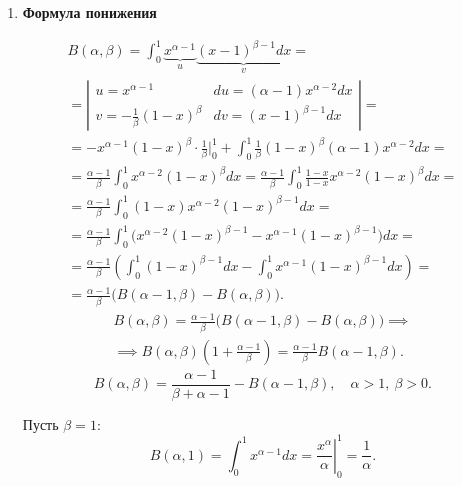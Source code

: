 \begin{enumerate}
    \item \textbf{Формула понижения}

          \begin{note}
              \begin{multline*}
                  B(\alpha,\beta) = \int_{0}^{1}\underbrace{x^{\alpha-1}}_{u}\underbrace{(x-1)^{\beta-1}dx}_{v} = \\
                  = \left|\begin{array}{ll}
                      u = x^{\alpha-1}                & du = (\alpha-1)x^{\alpha-2}dx \\
                      v = -\frac{1}{\beta}(1-x)^\beta & dv = (x-1)^{\beta-1}dx
                  \end{array}\right| = \\
                  = -x^{\alpha-1}(1-x)^\beta \cdot \frac{1}{\beta}\Bigg|_0^1 + \int_{0}^{1}\frac{1}{\beta}(1-x)^\beta(\alpha - 1)x^{\alpha-2}dx = \\
                  = \frac{\alpha -1}{\beta}\int_{0}^{1}x^{\alpha-2}(1-x)^\beta dx = \frac{\alpha - 1}{\beta}\int_{0}^{1}\frac{1-x}{1-x}x^{\alpha-2}(1-x)^\beta dx = \\
                  = \frac{\alpha -1}{\beta}\int_{0}^{1}(1-x)x^{\alpha-2}(1-x)^{\beta-1}dx = \\
                  = \frac{\alpha - 1}{\beta}\int_{0}^{1}\bigl(x^{\alpha-2}(1-x)^{\beta-1} - x^{\alpha-1}(1-x)^{\beta-1}\bigr)dx = \\
                  = \frac{\alpha-1}{\beta}\left(\int_{0}^{1}(1-x)^{\beta-1}dx - \int_{0}^{1}x^{\alpha-1}(1-x)^{\beta-1}dx\right) = \\
                  = \frac{\alpha-1}{\beta}\bigl(B(\alpha-1,\beta) - B(\alpha,\beta)\bigr).
              \end{multline*}
              \begin{multline*}
                  B(\alpha,\beta) = \frac{\alpha-1}{\beta}\bigl(B(\alpha-1,\beta) - B(\alpha,\beta)\bigr) \implies \\
                  \implies B(\alpha,\beta)\left(1 + \frac{\alpha - 1}{\beta}\right) = \frac{\alpha-1}{\beta}B(\alpha-1,\beta).
              \end{multline*}
              \[
                  \boxed{B(\alpha,\beta) = \frac{\alpha -1}{\beta + \alpha -1} - B(\alpha-1,\beta)}, \quad \alpha > 1, \ \beta > 0.
              \]

              Пусть $ \beta = 1 $:
              \[
                  B(\alpha,1) = \int_{0}^{1}x^{\alpha-1}dx = \left.\frac{x^\alpha}{\alpha}\right|_0^1 = \frac{1}{\alpha}.
              \]


\end{note}
\end{enumerate}
